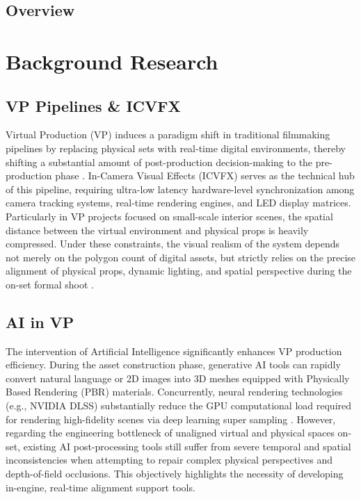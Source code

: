 \documentclass[12pt,a4paper]{report}
\begin{document}
\section{Overview}


\chapter{Background Research}

\section{VP Pipelines \& ICVFX}
Virtual Production (VP) induces a paradigm shift in traditional filmmaking pipelines by replacing physical sets with real-time digital environments, thereby shifting a substantial amount of post-production decision-making to the pre-production phase \cite{kadner2019vp}. In-Camera Visual Effects (ICVFX) serves as the technical hub of this pipeline, requiring ultra-low latency hardware-level synchronization among camera tracking systems, real-time rendering engines, and LED display matrices. Particularly in VP projects focused on small-scale interior scenes, the spatial distance between the virtual environment and physical props is heavily compressed. Under these constraints, the visual realism of the system depends not merely on the polygon count of digital assets, but strictly relies on the precise alignment of physical props, dynamic lighting, and spatial perspective during the on-set formal shoot \cite{swords2024emergence}.

\section{AI in VP}
The intervention of Artificial Intelligence significantly enhances VP production efficiency. During the asset construction phase, generative AI tools can rapidly convert natural language or 2D images into 3D meshes equipped with Physically Based Rendering (PBR) materials. Concurrently, neural rendering technologies (e.g., NVIDIA DLSS) substantially reduce the GPU computational load required for rendering high-fidelity scenes via deep learning super sampling \cite{alarcon2020dlss}. However, regarding the engineering bottleneck of unaligned virtual and physical spaces on-set, existing AI post-processing tools still suffer from severe temporal and spatial inconsistencies when attempting to repair complex physical perspectives and depth-of-field occlusions. This objectively highlights the necessity of developing in-engine, real-time alignment support tools.
\end{document}
